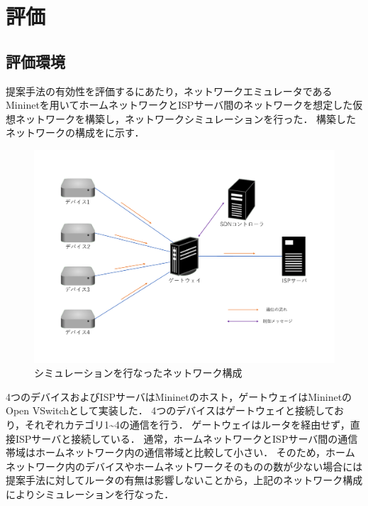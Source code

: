 \documentclass[a4paper,11pt,uplatex]{ujreport}
\begin{document}

\chapter{評価}
\label{chap:評価}

\section{評価環境}
\label{評価環境}

  提案手法の有効性を評価するにあたり，ネットワークエミュレータであるMininet\cite{Mininet}を用いてホームネットワークとISPサーバ間のネットワークを想定した仮想ネットワークを構築し，ネットワークシミュレーションを行った．
  構築したネットワークの構成をに示す．\par

  \begin{figure}[!b]
    \centering
    \includegraphics[width=\linewidth]{img/experiment.pdf}
    \caption{シミュレーションを行なったネットワーク構成}
    \label{fig:experiment}
  \end{figure}

  4つのデバイスおよびISPサーバはMininetのホスト，ゲートウェイはMininetのOpen VSwitchとして実装した．
  4つのデバイスはゲートウェイと接続しており，それぞれカテゴリ1\textasciitilde4の通信を行う．
  ゲートウェイはルータを経由せず，直接ISPサーバと接続している．
  通常，ホームネットワークとISPサーバ間の通信帯域はホームネットワーク内の通信帯域と比較して小さい．
  そのため，ホームネットワーク内のデバイスやホームネットワークそのものの数が少ない場合には提案手法に対してルータの有無は影響しないことから，上記のネットワーク構成によりシミュレーションを行なった．
  
\end{document}
